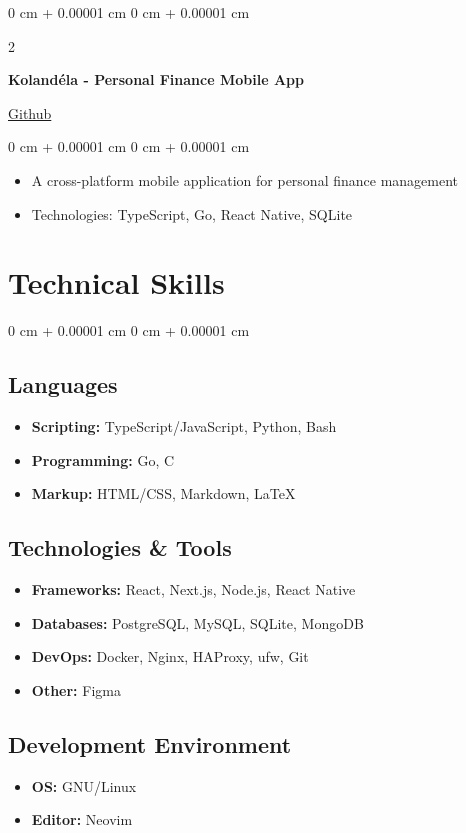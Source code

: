 \documentclass[10pt, letterpaper]{article}
\newenvironment{highlights}{
  \begin{itemize}[
    topsep=0.10 cm,
    parsep=0.10 cm,
    partopsep=0pt,
    itemsep=0pt,
    leftmargin=0 cm + 10pt
  ]
}{
  \end{itemize}
} %
\newenvironment{onecolentry}{
  \begin{adjustwidth}{
    0 cm + 0.00001 cm
  }{
    0 cm + 0.00001 cm
  }
}{
  \end{adjustwidth}
} %
\newenvironment{twocolentry}[2][]{
  \onecolentry
    \def\secondColumn{#2}
  \setcolumnwidth{\fill, 4.5 cm}
  \begin{paracol}{2}
}{
  \switchcolumn \raggedleft \secondColumn
    \end{paracol}
  \endonecolentry
} %
\begin{document}
\begin{twocolentry}{
  \href{https://github.com/ssnnee/kolandela}{Github}
}
\textbf{Kolandéla - Personal Finance Mobile App}
\end{twocolentry}

\vspace{0.10 cm}
\begin{onecolentry}
\begin{highlights}
\item A cross-platform mobile application for personal finance management
\item Technologies: TypeScript, Go, React Native, SQLite
\end{highlights}
\end{onecolentry}

\section{Technical Skills}

\begin{onecolentry}
\subsection{Languages}
\begin{highlights}
\item \textbf{Scripting:} TypeScript/JavaScript, Python, Bash
\item \textbf{Programming:} Go, C
\item \textbf{Markup:} HTML/CSS, Markdown, \LaTeX
\end{highlights}

\subsection{Technologies \& Tools}
\begin{highlights}
\item \textbf{Frameworks:} React, Next.js, Node.js, React Native
\item \textbf{Databases:} PostgreSQL, MySQL, SQLite, MongoDB
\item \textbf{DevOps:} Docker, Nginx, HAProxy, ufw, Git
\item \textbf{Other:}  Figma
\end{highlights}

\subsection{Development Environment}
\begin{highlights}
\item \textbf{OS:} GNU/Linux
\item \textbf{Editor:} Neovim
\end{highlights}
\end{onecolentry}
\end{document}
